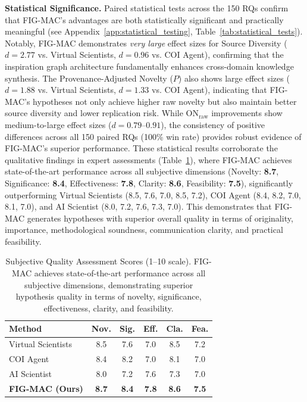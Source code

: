 \documentclass[runningheads]{llncs}
\begin{document}
\textbf{Statistical Significance.} Paired statistical tests across the 150 RQs confirm that FIG-MAC's advantages are both statistically significant and practically meaningful (see Appendix~\ref{app:statistical_testing}, Table~\ref{tab:statistical_tests}). Notably, FIG-MAC demonstrates \textit{very large} effect sizes for Source Diversity ($d = 2.77$ vs. Virtual Scientists, $d = 0.96$ vs. COI Agent), confirming that the inspiration graph architecture fundamentally enhances cross-domain knowledge synthesis. The Provenance-Adjusted Novelty ($P$) also shows large effect sizes ($d = 1.88$ vs. Virtual Scientists, $d = 1.33$ vs. COI Agent), indicating that FIG-MAC's hypotheses not only achieve higher raw novelty but also maintain better source diversity and lower replication risk. While ON$_{\text{raw}}$ improvements show medium-to-large effect sizes ($d = 0.79$--$0.91$), the consistency of positive differences across all 150 paired RQs (100\% win rate) provides robust evidence of FIG-MAC's superior performance. These statistical results corroborate the qualitative findings in expert assessments (Table~\ref{tab:subjective_quality}), where FIG-MAC achieves state-of-the-art performance across all subjective dimensions (Novelty: \textbf{8.7}, Significance: \textbf{8.4}, Effectiveness: \textbf{7.8}, Clarity: \textbf{8.6}, Feasibility: \textbf{7.5}), significantly outperforming Virtual Scientists (8.5, 7.6, 7.0, 8.5, 7.2), COI Agent (8.4, 8.2, 7.0, 8.1, 7.0), and AI Scientist (8.0, 7.2, 7.6, 7.3, 7.0). This demonstrates that FIG-MAC generates hypotheses with superior overall quality in terms of originality, importance, methodological soundness, communication clarity, and practical feasibility.

\begin{table}[t]
\centering
\small
\setlength{\tabcolsep}{4pt}
\begin{tabular}{lccccc}
\toprule
\textbf{Method} & \textbf{Nov.} & \textbf{Sig.} & \textbf{Eff.} & \textbf{Cla.} & \textbf{Fea.} \\
\midrule
Virtual Scientists & 8.5 & 7.6 & 7.0 & 8.5 & 7.2 \\
COI Agent & 8.4 & 8.2 & 7.0 & 8.1 & 7.0 \\
AI Scientist & 8.0 & 7.2 & 7.6 & 7.3 & 7.0 \\
\midrule
\textbf{FIG-MAC (Ours)} & \textbf{8.7} & \textbf{8.4} & \textbf{7.8} & \textbf{8.6} & \textbf{7.5} \\
\bottomrule
\end{tabular}
\caption{Subjective Quality Assessment Scores (1--10 scale). FIG-MAC achieves state-of-the-art performance across all subjective dimensions, demonstrating superior hypothesis quality in terms of novelty, significance, effectiveness, clarity, and feasibility.}
\label{tab:subjective_quality}
\end{table}
\end{document}
